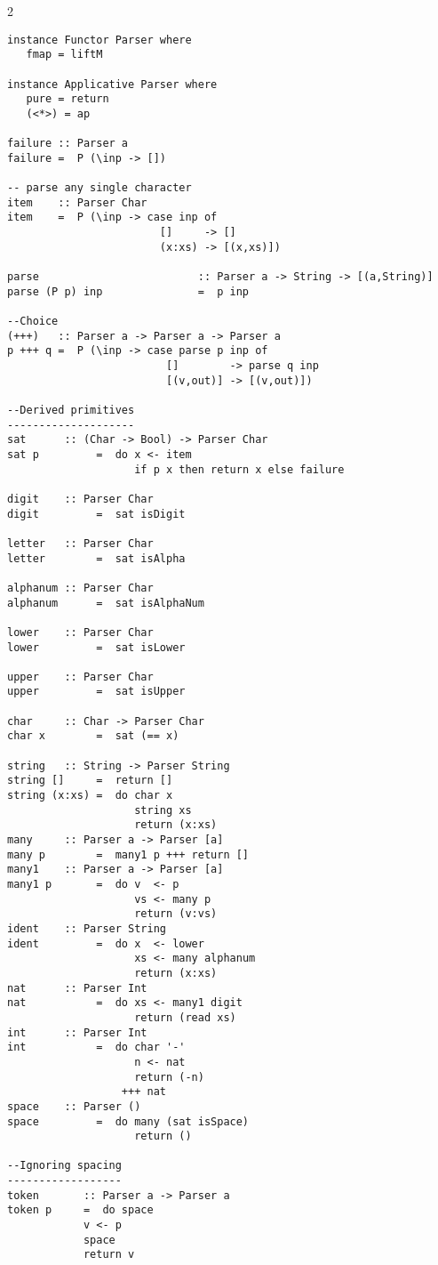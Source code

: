 \documentclass{article}
\def \columncount {2}
\begin{document}
\begin{multicols*}{\columncount}
\begin{outline}[longenum]
\begin{verbatim}
instance Functor Parser where
   fmap = liftM

instance Applicative Parser where
   pure = return 
   (<*>) = ap

failure :: Parser a
failure =  P (\inp -> [])

-- parse any single character
item    :: Parser Char
item    =  P (\inp -> case inp of
                        []     -> []
                        (x:xs) -> [(x,xs)])

parse                         :: Parser a -> String -> [(a,String)]
parse (P p) inp               =  p inp

--Choice
(+++)   :: Parser a -> Parser a -> Parser a
p +++ q =  P (\inp -> case parse p inp of
                         []        -> parse q inp
                         [(v,out)] -> [(v,out)])

--Derived primitives
--------------------
sat      :: (Char -> Bool) -> Parser Char
sat p         =  do x <- item
                    if p x then return x else failure

digit    :: Parser Char
digit         =  sat isDigit

letter   :: Parser Char
letter        =  sat isAlpha

alphanum :: Parser Char
alphanum      =  sat isAlphaNum

lower    :: Parser Char
lower         =  sat isLower

upper    :: Parser Char
upper         =  sat isUpper

char     :: Char -> Parser Char
char x        =  sat (== x)

string   :: String -> Parser String
string []     =  return []
string (x:xs) =  do char x
                    string xs
                    return (x:xs)
many     :: Parser a -> Parser [a]
many p        =  many1 p +++ return []
many1    :: Parser a -> Parser [a]
many1 p       =  do v  <- p
                    vs <- many p
                    return (v:vs)
ident    :: Parser String
ident         =  do x  <- lower
                    xs <- many alphanum
                    return (x:xs)
nat      :: Parser Int
nat           =  do xs <- many1 digit
                    return (read xs)
int      :: Parser Int
int           =  do char '-'
                    n <- nat
                    return (-n)
                  +++ nat
space    :: Parser ()
space         =  do many (sat isSpace)
                    return ()

--Ignoring spacing
------------------
token       :: Parser a -> Parser a
token p     =  do space
            v <- p
            space
            return v


\end{verbatim}
\end{outline}
\end{multicols*}
\end{document}
